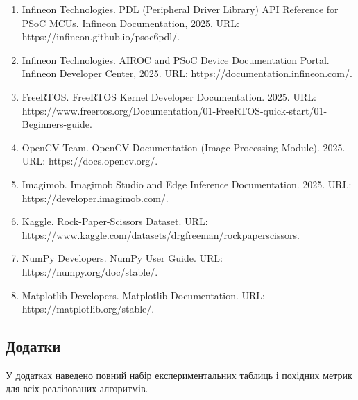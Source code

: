\documentclass[a4paper,12pt]{article}
\begin{document}
\begin{enumerate}
	\item Infineon Technologies. PDL (Peripheral Driver Library) API Reference for PSoC\texttrademark{} MCUs. Infineon Documentation, 2025. URL: https://infineon.github.io/psoc6pdl/.
	\item Infineon Technologies. AIROC\texttrademark{} and PSoC\texttrademark{} Device Documentation Portal. Infineon Developer Center, 2025. URL: https://documentation.infineon.com/.
	\item FreeRTOS. FreeRTOS Kernel Developer Documentation. 2025. URL: https://www.freertos.org/Documentation/01-FreeRTOS-quick-start/01-Beginners-guide.
	\item OpenCV Team. OpenCV Documentation (Image Processing Module). 2025. URL: https://docs.opencv.org/.
	\item Imagimob. Imagimob Studio and Edge Inference Documentation. 2025. URL: https://developer.imagimob.com/.
	\item Kaggle. Rock-Paper-Scissors Dataset. URL: https://www.kaggle.com/datasets/drgfreeman/rockpaperscissors.
	\item NumPy Developers. NumPy User Guide. URL: https://numpy.org/doc/stable/.
	\item Matplotlib Developers. Matplotlib Documentation. URL: https://matplotlib.org/stable/.
\end{enumerate}

\newpage
\subsection*{Додатки}
\noindent У додатках наведено повний набір експериментальних таблиць і похідних метрик для всіх реалізованих алгоритмів.


\end{document}
